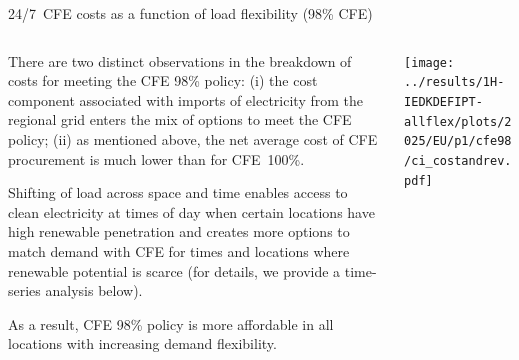 \begin{frame}{24/7~CFE costs as a function of load flexibility (98\% CFE)}
  \label{cfe98cost}

  {\footnotesize
  \vspace{0.2cm}
  
  \begin{columns}[T]

  \begin{column}{6cm}
  There are two distinct observations in the breakdown of costs for meeting the CFE 98\% policy: (i) the cost component associated with imports of electricity from the regional grid enters the mix of options to meet the CFE policy; (ii) as mentioned above, the net average cost of CFE procurement is much lower than for CFE~100\%.

  \vspace{0.1cm}
  Shifting of load across space and time \alert{enables access to clean electricity} at times of day when certain locations have high renewable penetration and \alert{creates more options to match demand with CFE} for times and locations where renewable potential is scarce (for details, we provide a time-series analysis below). 

  \vspace{0.1cm}
  As a result, CFE 98\% policy is more affordable in all locations with increasing demand flexibility. 

  \end{column}

  \begin{column}{9cm}
    \centering
    \texttt{[image: ../results/1H-IEDKDEFIPT-allflex/plots/2025/EU/p1/cfe98/ci\_costandrev.pdf]}
  \end{column}

  \end{columns}
  }
\end{frame}



